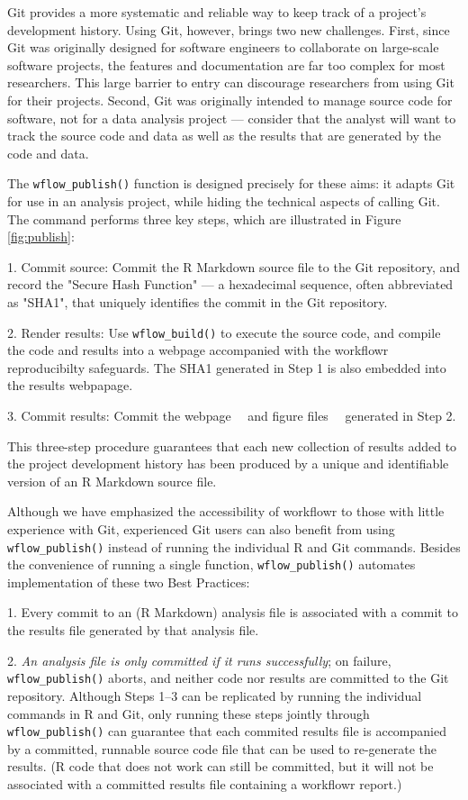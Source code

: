 \documentclass[9pt,a4paper]{extarticle}
\begin{document}
Git provides a more systematic and reliable way to keep track of a
project's development history. Using Git, however, brings two new
challenges. First, since Git was originally designed for software
engineers to collaborate on large-scale software projects, the features
and documentation are far too complex for most researchers. This large
barrier to entry can discourage researchers from using Git for their
projects. Second, Git was originally intended to manage source code for
software, not for a data analysis project --- consider that the analyst
will want to track the source code and data as well as the results that
are generated by the code and data.

The \verb|wflow_publish()| function is designed precisely for these aims: it
adapts Git for use in an analysis project, while hiding the technical
aspects of calling Git. The command performs three key steps, which are
illustrated in Figure \ref{fig:publish}:

1. Commit source: Commit the R Markdown source file to the Git
repository, and record the "Secure Hash Function" --- a hexadecimal
sequence, often abbreviated as "SHA1", that uniquely identifies the
commit in the Git repository.

2. Render results: Use \verb|wflow_build()| to execute the source code, and
compile the code and results into a webpage accompanied with the
workflowr reproducibilty safeguards. The SHA1 generated in Step 1 is
also embedded into the results webpapage.

3. Commit results: Commit the webpage ~~and figure files~~ generated in
Step 2.

This three-step procedure guarantees that each new collection of results
added to the project development history has been produced by a unique
and identifiable version of an R Markdown source file.

Although we have emphasized the accessibility of workflowr to those with
little experience with Git, experienced Git users can also benefit from
using \verb|wflow_publish()| instead of running the individual R and Git
commands. Besides the convenience of running a single function,
\verb|wflow_publish()| automates implementation of these two Best Practices:

1. Every commit to an (R Markdown) analysis file is associated with a
commit to the results file generated by that analysis file.

2. \textit{An analysis file is only committed if it runs successfully};
on failure, \verb|wflow_publish()| aborts, and neither code nor results are
committed to the Git repository. Although Steps 1–3 can be replicated by
running the individual commands in R and Git, only running these steps
jointly through \verb|wflow_publish()| can guarantee that each commited results
file is accompanied by a committed, runnable source code file that can
be used to re-generate the results. (R code that does not work can still
be committed, but it will not be associated with a committed results
file containing a workflowr report.)
\end{document}
